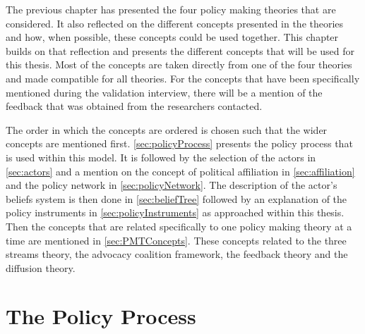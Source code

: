 The previous chapter has presented the four policy making theories that are considered. It also reflected on the different concepts presented in the theories and how, when possible, these concepts could be used together. This chapter builds on that reflection and presents the different concepts that will be used for this thesis. Most of the concepts are taken directly from one of the four theories and made compatible for all theories. For the concepts that have been specifically mentioned during the validation interview, there will be a mention of the feedback that was obtained from the researchers contacted.

The order in which the concepts are ordered is chosen such that the wider concepts are mentioned first. \autoref{sec:policyProcess} presents the policy process that is used within this model. It is followed by the selection of the actors in \autoref{sec:actors} and a mention on the concept of political affiliation in \autoref{sec:affiliation} and the policy network in \autoref{sec:policyNetwork}. The description of the actor's beliefs system is then done in \autoref{sec:beliefTree} followed by an explanation of the policy instruments in \autoref{sec:policyInstruments} as approached within this thesis. Then the concepts that are related specifically to one policy making theory at a time are mentioned in \autoref{sec:PMTConcepts}. These concepts related to the three streams theory, the advocacy coalition framework, the feedback theory and the diffusion theory.


%


%
\section{The Policy Process}
\label{sec:policyProcess}

